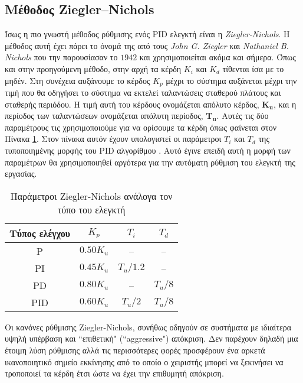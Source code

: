 \subsection{Μέθοδος Ziegler–Nichols}

Ίσως η πιο γνωστή μέθοδος ρύθμισης ενός PID ελεγκτή είναι η \emph{Ziegler-Nichols}. Η μέθοδος αυτή έχει πάρει το όνομά της από τους \emph{John G. Ziegler} και \emph{Nathaniel B. Nichols} που την παρουσίασαν το $1942$ και χρησιμοποιείται ακόμα και σήμερα. Όπως και στην προηγούμενη μέθοδο, στην αρχή τα κέρδη $K_i$ και $K_d$ τίθενται ίσα με το μηδέν. Στη συνέχεια αυξάνουμε το κέρδος $K_p$ μέχρι το σύστημα αυξάνεται μέχρι την τιμή που θα οδηγήσει το σύστημα να εκτελεί ταλαντώσεις σταθερού πλάτους και σταθερής περιόδου. Η τιμή αυτή του κέρδους ονομάζεται απόλυτο κέρδος, $\boldsymbol{K_u}$, και η περίοδος των ταλαντώσεων ονομάζεται απόλυτη περίοδος, $\boldsymbol{T_u}$. Αυτές τις δύο παραμέτρους τις χρησιμοποιούμε για να ορίσουμε τα κέρδη όπως φαίνεται στον Πίνακα \ref{table:zn_method}. Στον πίνακα αυτόν έχουν υπολογιστεί οι παράμετροι $T_i$ και $T_d$ της τυποποιημένης μορφής του PID αλγορίθμου \cite{ziegler-nichols}. Αυτό έγινε επειδή αυτή η μορφή των παραμέτρων θα χρησιμοποιηθεί αργότερα για την αυτόματη ρύθμιση του ελεγκτή της εργασίας.


\begin{table}[H]
 \begin{center}
 \begin{tabular}{|c|c|c|c|}
 \hline
 Τύπος ελέγχου & $K_p$ & $T_i$ & $T_d$ \\ \hline
 P & $0.50K_u$ & -- & -- \\ \hline
 PI & $0.45K_u$ & $T_u/1.2$ & -- \\ \hline
 PD & $0.80K_u$ & -- & $T_u/8$ \\ \hline
 PID & $0.60K_u$ & $T_u/2$ & $T_u/8$ \\ \hline
 \end{tabular}
 \caption{Παράμετροι Ziegler-Nichols ανάλογα τον τύπο του ελεγκτή}
 \label{table:zn_method}
 \end{center}
\end{table}

Οι κανόνες ρύθμισης Ziegler-Nichols, συνήθως οδηγούν σε συστήματα με ιδιαίτερα υψηλή υπέρβαση και ``επιθετική" (``aggressive") απόκριση. Δεν παρέχουν δηλαδή μια έτοιμη λύση ρύθμισης αλλά τις περισσότερες φορές προσφέρουν ένα αρκετά ικανοποιητικό σημείο εκκίνησης από το οποίο ο χειριστής μπορεί να ξεκινήσει να τροποποιεί τα κέρδη έτσι ώστε να έχει την επιθυμητή απόκριση.

